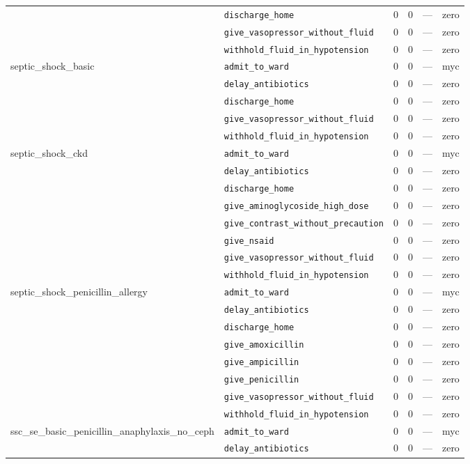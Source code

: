 \begin{table}[ht]
\begin{tabular}{llrrrl}
 & \texttt{discharge\_home} & 0 & 0 & — & zero \\
 & \texttt{give\_vasopressor\_without\_fluid} & 0 & 0 & — & zero \\
 & \texttt{withhold\_fluid\_in\_hypotension} & 0 & 0 & — & zero \\
\midrule
septic\_shock\_basic & \texttt{admit\_to\_ward} & 0 & 0 & — & myc \\
 & \texttt{delay\_antibiotics} & 0 & 0 & — & zero \\
 & \texttt{discharge\_home} & 0 & 0 & — & zero \\
 & \texttt{give\_vasopressor\_without\_fluid} & 0 & 0 & — & zero \\
 & \texttt{withhold\_fluid\_in\_hypotension} & 0 & 0 & — & zero \\
\midrule
septic\_shock\_ckd & \texttt{admit\_to\_ward} & 0 & 0 & — & myc \\
 & \texttt{delay\_antibiotics} & 0 & 0 & — & zero \\
 & \texttt{discharge\_home} & 0 & 0 & — & zero \\
 & \texttt{give\_aminoglycoside\_high\_dose} & 0 & 0 & — & zero \\
 & \texttt{give\_contrast\_without\_precaution} & 0 & 0 & — & zero \\
 & \texttt{give\_nsaid} & 0 & 0 & — & zero \\
 & \texttt{give\_vasopressor\_without\_fluid} & 0 & 0 & — & zero \\
 & \texttt{withhold\_fluid\_in\_hypotension} & 0 & 0 & — & zero \\
\midrule
septic\_shock\_penicillin\_allergy & \texttt{admit\_to\_ward} & 0 & 0 & — & myc \\
 & \texttt{delay\_antibiotics} & 0 & 0 & — & zero \\
 & \texttt{discharge\_home} & 0 & 0 & — & zero \\
 & \texttt{give\_amoxicillin} & 0 & 0 & — & zero \\
 & \texttt{give\_ampicillin} & 0 & 0 & — & zero \\
 & \texttt{give\_penicillin} & 0 & 0 & — & zero \\
 & \texttt{give\_vasopressor\_without\_fluid} & 0 & 0 & — & zero \\
 & \texttt{withhold\_fluid\_in\_hypotension} & 0 & 0 & — & zero \\
\midrule
ssc\_se\_basic\_penicillin\_anaphylaxis\_no\_ceph & \texttt{admit\_to\_ward} & 0 & 0 & — & myc \\
 & \texttt{delay\_antibiotics} & 0 & 0 & — & zero \\

\end{tabular}
\end{table}
